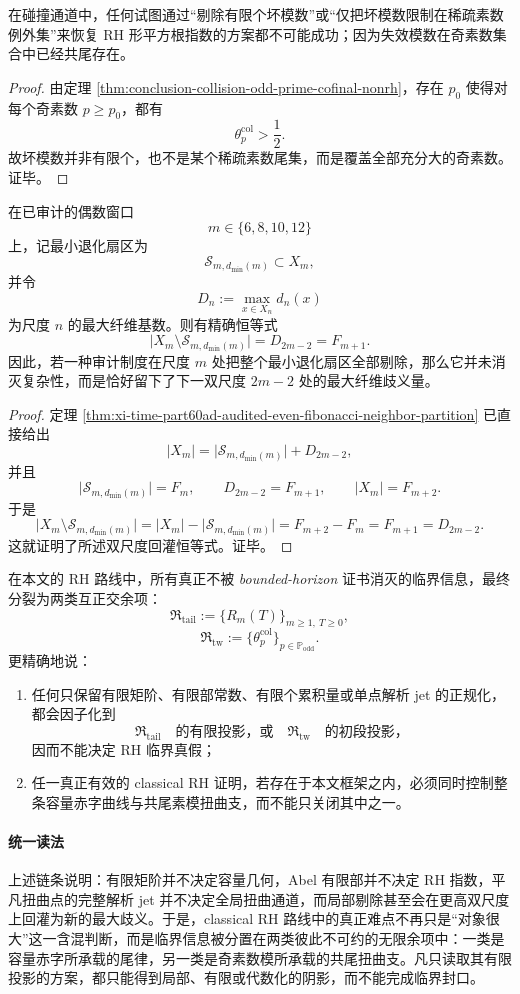 \begin{corollary}[素模例外集方案的破产]\label{cor:conclusion-prime-modulus-exception-scheme-collapse}
在碰撞通道中，任何试图通过“剔除有限个坏模数”或“仅把坏模数限制在稀疏素数例外集”来恢复 RH 形平方根指数的方案都不可能成功；因为失效模数在奇素数集合中已经共尾存在。
\end{corollary}
\begin{proof}
由定理 \ref{thm:conclusion-collision-odd-prime-cofinal-nonrh}，存在 \(p_0\) 使得对每个奇素数 \(p\ge p_0\)，都有
\[
\theta_p^{\mathrm{col}}>\frac12.
\]
故坏模数并非有限个，也不是某个稀疏素数尾集，而是覆盖全部充分大的奇素数。证毕。
\end{proof}

\begin{theorem}[最小退化剔除的双尺度回灌律]\label{thm:conclusion-minsector-doublescale-feedback-law}
在已审计的偶数窗口
\[
m\in\{6,8,10,12\}
\]
上，记最小退化扇区为
\[
\mathcal S_{m,d_{\min}(m)}\subset X_m,
\]
并令
\[
D_n:=\max_{x\in X_n}d_n(x)
\]
为尺度 \(n\) 的最大纤维基数。则有精确恒等式
\[
\bigl|X_m\setminus \mathcal S_{m,d_{\min}(m)}\bigr|
=
D_{2m-2}
=
F_{m+1}.
\]
因此，若一种审计制度在尺度 \(m\) 处把整个最小退化扇区全部剔除，那么它并未消灭复杂性，而是恰好留下了下一双尺度 \(2m-2\) 处的最大纤维歧义量。
\end{theorem}
\begin{proof}
定理 \ref{thm:xi-time-part60ad-audited-even-fibonacci-neighbor-partition} 已直接给出
\[
|X_m|
=
\bigl|\mathcal S_{m,d_{\min}(m)}\bigr|+D_{2m-2},
\]
并且
\[
\bigl|\mathcal S_{m,d_{\min}(m)}\bigr|=F_m,
\qquad
D_{2m-2}=F_{m+1},
\qquad
|X_m|=F_{m+2}.
\]
于是
\[
\bigl|X_m\setminus \mathcal S_{m,d_{\min}(m)}\bigr|
=
|X_m|-\bigl|\mathcal S_{m,d_{\min}(m)}\bigr|
=
F_{m+2}-F_m
=
F_{m+1}
=
D_{2m-2}.
\]
这就证明了所述双尺度回灌恒等式。证毕。
\end{proof}

\begin{conjecture}\label{conj:conclusion-rh-tail-twist-dual-obstruction}
在本文的 RH 路线中，所有真正不被 \textit{bounded-horizon} 证书消灭的临界信息，最终分裂为两类互正交余项：
\[
\mathfrak R_{\mathrm{tail}}
:=
\{R_m(T)\}_{m\ge 1,\ T\ge 0},
\]
\[
\mathfrak R_{\mathrm{tw}}
:=
\{\theta_p^{\mathrm{col}}\}_{p\in\mathbb P_{\mathrm{odd}}}.
\]
更精确地说：
\begin{enumerate}
  \item 任何只保留有限矩阶、有限部常数、有限个累积量或单点解析 jet 的正规化，都会因子化到
  \[
  \mathfrak R_{\mathrm{tail}}
  \quad\text{的有限投影，或}\quad
  \mathfrak R_{\mathrm{tw}}
  \quad\text{的初段投影，}
  \]
  因而不能决定 RH 临界真假；
  \item 任一真正有效的 classical RH 证明，若存在于本文框架之内，必须同时控制整条容量赤字曲线与共尾素模扭曲支，而不能只关闭其中之一。
\end{enumerate}
\end{conjecture}

\paragraph{统一读法}
上述链条说明：有限矩阶并不决定容量几何，Abel 有限部并不决定 RH 指数，平凡扭曲点的完整解析 jet 并不决定全局扭曲通道，而局部剔除甚至会在更高双尺度上回灌为新的最大歧义。于是，classical RH 路线中的真正难点不再只是“对象很大”这一含混判断，而是临界信息被分置在两类彼此不可约的无限余项中：一类是容量赤字所承载的尾律，另一类是奇素数模所承载的共尾扭曲支。凡只读取其有限投影的方案，都只能得到局部、有限或代数化的阴影，而不能完成临界封口。

\endinput
